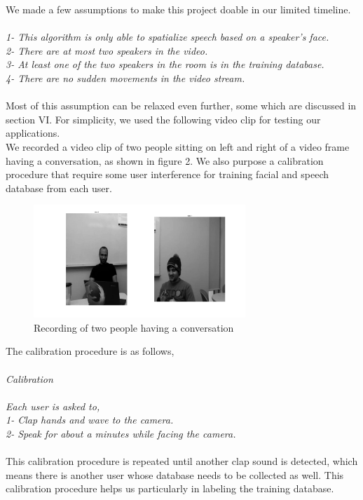 \documentclass{article}
\begin{document}
We made a few assumptions to make this project doable in our limited timeline. \\ \\
{\it 1- This algorithm is only able to spatialize speech based on a speaker's face.
\\ 2- There are at most two speakers in the video. 
\\ 3- At least one of the two speakers in the room is in the training database.
\\ 4- There are no sudden movements in the video stream.}\\ \\

Most of this assumption can be relaxed even further, some which are discussed in section VI. For simplicity, we used the following video clip for testing our applications. \\
We recorded a video clip of two people sitting on left and right of a video frame having a conversation, as shown in figure 2. We also purpose a calibration procedure that require some user interference for training facial and speech database from each user.

\begin{figure}[htb]
\begin{minipage}[b]{0.88\linewidth}
\centering
\centerline{\includegraphics[width=8.0cm]{faraz_marcell.jpg}}
\end{minipage}
\caption{Recording of two people having a conversation}
\label{fig:res}
\end{figure}
\centerline{}

The calibration procedure is as follows, \\
\\
{\it Calibration \\ \\
Each user is asked to, \\
1- Clap hands and wave to the camera. \\
2- Speak for about a minutes while facing the camera. \\ }\\
This calibration procedure is repeated until another clap sound is detected, which means there is another user whose database needs to be collected as well. This calibration procedure helps us particularly in labeling the training database. \\
\end{document}
